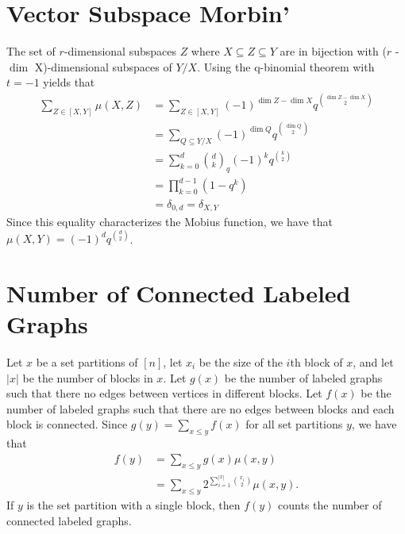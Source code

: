 \documentclass{article}
\newcommand{\qbinom}[2]{\binom{#1}{#2}_{q}}
\begin{document}
   \section{Vector Subspace Morbin'}
      The set of $r$-dimensional subspaces $Z$ where $X \subseteq Z \subseteq Y$
      are in bijection with ($r$ - $\dim$ X)-dimensional subspaces of $Y/X$.
      Using the q-binomial theorem with $t=-1$ yields that 
         \begin{align*}
            \sum_{Z \in [X, Y]} \mu(X, Z)
            &= \sum_{Z \in [X, Y]} (-1)^{\dim Z - \dim X} q^{\binom{\dim Z - \dim X}{2}} \\
            &= \sum_{Q \subseteq Y/X} (-1)^{\dim Q} q^{\binom{\dim Q}{2}} \\
            &= \sum_{k=0}^d \qbinom{d}{k} (-1)^{k} q^{\binom{k}{2}} \\
            &= \prod_{k=0}^{d-1}(1-q^k) \\
            &= \delta_{0, d} 
            = \delta_{X, Y}
         \end{align*}
      Since this equality characterizes the Mobius function,
      we have that $\mu(X, Y) = (-1)^dq^{\binom{d}{2}}$.
   \newpage
   \section{Number of Connected Labeled Graphs}
         Let $x$ be a set partitions of $[n]$,
         let $x_i$ be the size of the $i$th block of $x$, and 
         let $|x|$ be the number of blocks in $x$. 
         Let $g(x)$ be the number of labeled graphs such that there no edges between 
         vertices in different blocks.
         Let $f(x)$ be the number of labeled graphs such that there are no edges 
         between blocks and each block is connected.
         Since $g(y) = \sum_{x \leq y}f(x)$ for all set partitions $y$, we have that 
         \begin{align*}
            f(y) 
            &= \sum_{x \leq y}g(x)\mu(x, y) \\
            &= \sum_{x \leq y}2^{\sum_{i=1}^{|x|} \binom{x_i}{2}}\mu(x, y).
         \end{align*}
         If $y$ is the set partition with a single block,
         then $f(y)$ counts the number of connected labeled graphs.
\end{document}

